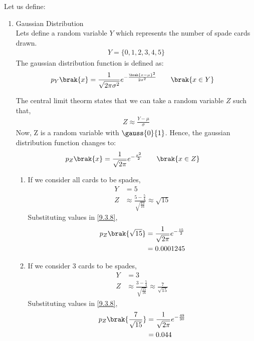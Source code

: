 \documentclass[journal,12pt,twocolumn]{IEEEtran}
\theoremstyle{remark}
\begin{document}
\solution
Let us define:
\begin{table}[!ht]

\end{table}
\begin{enumerate}[label=(\roman*)]
\item {Gaussian Distribution}\\
Lets define a random variable $Y$ which represents the number of spade cards drawn.
\begin{align}
Y = \{0,1,2,3,4,5\}
\end{align}
The gaussian distribution function is defined as:
\begin{align}
p_Y\brak{x} &= \frac{1}{\sqrt{2\pi{\sigma}^2}} e^{-\frac{\brak{x-\mu}^2}{2{\sigma}^2}} \qquad \brak{x \in Y}
\end{align}

The central limit theorm states that we can take a random variable $Z$ such that,
\begin{align}
Z \approx \frac{Y-\mu}{\sigma}
\end{align}
Now, Z is a random variable with $\gauss{0}{1}$. Hence, the gaussian distribution function changes to:
\begin{align}
p_Z\brak{x} &= \frac{1}{\sqrt{2\pi}} e^{-\frac{{x}^2}{2}} \qquad \brak{x \in Z}\label{9.3.8}
\end{align}
\begin{enumerate}[label=(\alph*)]
\item If we consider all cards to be spades,
\begin{align}
Y &= 5\\
Z &\approx \frac{5 - \frac{5}{4}}{\sqrt{\frac{15}{16}}} \approx \sqrt{15}
\end{align}
Substituting values in \eqref{9.3.8},
\begin{align}
p_Z\brak{\sqrt{15}} &= \frac{1}{\sqrt{2\pi}} e^{-\frac{15}{2}}\\
	           &= 0.0001245
\end{align}
\item If we consider 3 cards to be spades,
\begin{align}
Y &= 3\\
Z &\approx \frac{3 - \frac{5}{4}}{\sqrt{\frac{15}{16}}} \approx \frac{7}{\sqrt{15}}
\end{align}
Substituting values in \eqref{9.3.8},
\begin{align}
p_Z\brak{\frac{7}{\sqrt{15}}} &= \frac{1}{\sqrt{2\pi}} e^{-\frac{49}{30}}\\
			      &= 0.044
\end{align}

\end{enumerate}
\end{enumerate}
\end{document}
